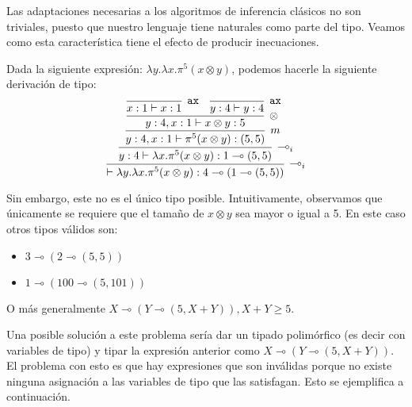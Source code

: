 Las adaptaciones necesarias a los algoritmos de inferencia clásicos no son triviales, puesto que nuestro lenguaje tiene naturales como parte del tipo. Veamos como esta característica tiene el efecto de producir inecuaciones.
\begin{ejemplo}\label{ej:lamrho_tip}
    Dada la siguiente expresión: $\lambda y.\lambda x.\pi^5(x \otimes y)$, podemos hacerle la siguiente derivación de tipo:
\begin{equation*}
\infer[\multimap_i]
{\vdash\lambda y.\lambda x.\pi^5(x\otimes y) : 4 \multimap (1 \multimap (5, 5))}
{\infer[\multimap_i]
    {y: 4 \vdash \lambda x.\pi^5(x\otimes y) : 1 \multimap (5, 5)}
    {\infer[m]
        {y: 4, x:1 \vdash \pi^5(x\otimes y) : (5, 5)}
        {\infer[\otimes]
            {y: 4, x:1 \vdash x\otimes y : 5}
            {\infer[\mathtt{ax}]{x:1 \vdash x : 1}{} \quad \infer[\mathtt{ax}]{y:4 \vdash y :4}{}}
    }}}
\end{equation*}

    Sin embargo, este no es el único tipo posible. Intuitivamente, observamos que únicamente se requiere que el tamaño de $x \otimes y$ sea mayor o igual a 5. En este caso otros tipos válidos son:
    \begin{itemize}
        \item $3 \multimap (2 \multimap (5, 5))$
        \item $1 \multimap (100 \multimap (5, 101))$
    \end{itemize}
    O más generalmente $X \multimap (Y\multimap (5, X+Y)), X+Y\geq 5$.
\end{ejemplo}

Una posible solución a este problema sería  dar un tipado polimórfico (es decir con variables de tipo) y tipar la expresión anterior como $X \multimap (Y \multimap (5, X+Y))$. El problema con esto es que hay expresiones que son inválidas porque no existe ninguna asignación a las variables de tipo que las satisfagan. Esto se ejemplifica a continuación.

